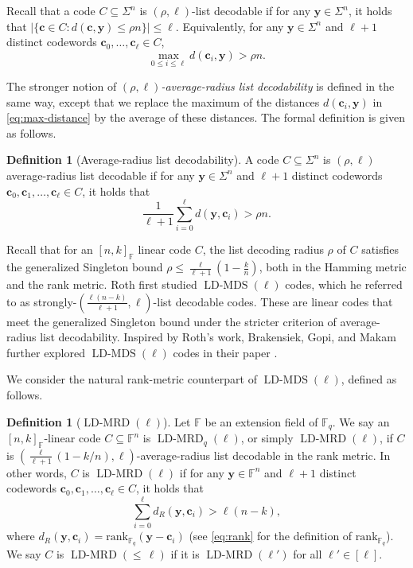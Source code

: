 \documentclass[11pt]{article}
\theoremstyle{plain}
\theoremstyle{definition}
\newtheorem{defn}[thm]{Definition}
\theoremstyle{remark}
\newcommand{\ldmrd}[1]{\operatorname{LD-MRD}({\leq}\,#1)}
\newcommand{\F}{\mathbb{F}}
\newcommand{\by}{\bm{y}}
\newcommand{\bc}{\bm{c}}
\newcommand{\rank}{\mathrm{rank}}
\begin{document}
Recall that a code $C\subseteq\Sigma^n$ is $(\rho,\ell)$-list decodable if for any $\by\in\Sigma^n$, it holds that $|\{\bc\in C: d(\bc,\by)\leq \rho n\}|\leq \ell$. Equivalently, for any $\by\in\Sigma^n$ and $\ell+1$ distinct codewords $\bc_0,\dots,\bc_\ell\in C$, 
\begin{equation}\label{eq:max-distance}
\max_{0\leq i\leq \ell} d(\bc_i, \by) > \rho n.
\end{equation}

The stronger notion of \emph{$(\rho,\ell)$-average-radius list decodability} is defined in the same way, except that we replace the maximum of the distances $d(\bc_i, \by)$ in \eqref{eq:max-distance} by the average of these distances. The formal definition is given as follows.

\begin{defn}[Average-radius list decodability]\label{defn:average}
A code $C\subseteq\Sigma^n$ is $(\rho,\ell)$ average-radius list decodable if for any $\by\in\Sigma^n$ and $\ell+1$ distinct codewords  $\bc_0,\bc_1,\dots,\bc_{\ell}\in C$, it holds that 
\[
\frac{1}{\ell+1}\sum_{i=0}^{\ell}{d(\by,\bc_i)}>\rho n.
\]
\end{defn}

Recall that for an $[n,k]_{\F}$ linear code $C$, the list decoding radius $\rho$ of $C$ satisfies the generalized Singleton bound
$\rho\leq \frac{\ell}{\ell+1}\left(1-\frac{k}{n}\right)$, both in the Hamming metric and the rank metric.
Roth \cite{roth2022higher} first studied $\operatorname{LD-MDS}(\ell)$ codes, which he referred to as strongly-$\left(\frac{\ell(n-k)}{\ell+1}, \ell\right)$-list decodable codes. These are linear codes that meet the generalized Singleton bound under the stricter criterion of average-radius list decodability. Inspired by Roth's work, Brakensiek, Gopi, and Makam further explored $\operatorname{LD-MDS}(\ell)$ codes in their paper \cite{brakensiek2023generic}.

We consider the natural rank-metric counterpart of $\operatorname{LD-MDS}(\ell)$, defined as follows.

\begin{defn}[$\operatorname{LD-MRD}(\ell)$] Let $\F$ be an extension field of $\F_q$.
We say an $[n,k]_{\F}$-linear code $C\subseteq\F^n$ is $\operatorname{LD-MRD}_q(\ell)$, or simply $\operatorname{LD-MRD}(\ell)$, if $C$ is $\left(\frac{\ell}{\ell+1}\left(1-{k}/{n}\right),\ell\right)$-average-radius list decodable in the rank metric. 
In other words, $C$ is $\operatorname{LD-MRD}(\ell)$ if for any $\by\in\F^n$ and $\ell+1$ distinct codewords  $\bc_0,\bc_1,\dots,\bc_{\ell}\in C$, it holds that 
\[
\sum_{i=0}^{\ell}{d_R(\by,\bc_i)}>\ell(n-k),
\]
where $d_R(\by,\bc_i)=\rank_{\F_q}(\by-\bc_i)$ (see \eqref{eq:rank} for the definition of $\rank_{\F_q}$).
We say $C$ is $\ldmrd{\ell}$ if it is $\operatorname{LD-MRD}(\ell')$ for all $\ell'\in [\ell]$. 
\end{defn}
\end{document}
